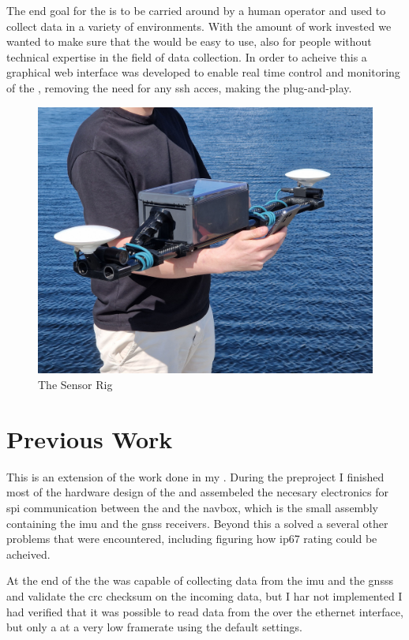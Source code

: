 The end goal for the \sr is to be carried around by a human operator and used to collect data in a variety of environments.
With the amount of work invested we wanted to make sure that the \sr would be easy to use, also for people without technical expertise in the field of data collection.
In order to acheive this a graphical web interface was developed to enable real time control and monitoring of the \sr, removing the need for any ssh acces, making the \sr plug-and-play.


\begin{figure}[H]
    \includegraphics[width=\textwidth]{figures/frontpage.jpg}
    \caption{The Sensor Rig}
\end{figure}

\section{Previous Work}
This \master is an extension of the work done in my \preproject \cite{martensPortableSensorRig2022}.
During the preproject I finished most of the hardware design of the \sr
and assembeled the necesary electronics for \gls{spi} communication between the \jx and the \gls{navbox}, which is the small assembly containing the \gls{imu} and the \gls{gnss} receivers.
Beyond this a solved a several other problems that were encountered, including figuring how \gls{ip67} rating could be acheived.

At the end of the \preproject the \sr was capable of collecting data from the \gls{imu} and the \glspl{gnss} and validate the \gls{crc} checksum on the incoming data, but I har not implemented
I had verified that it was possible to read data from the \cams over the ethernet interface, but only a at a very low framerate using the default settings.

